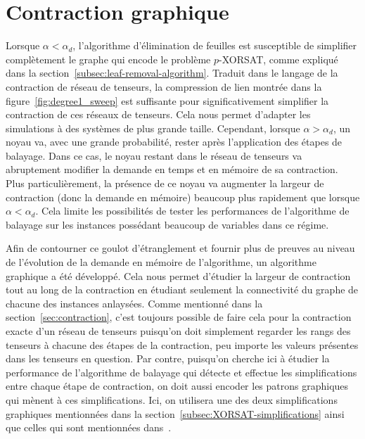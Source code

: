 \chapter{Contraction graphique} \label{ch:graphical-method}
Lorsque $\alpha < \alpha_d$, l'algorithme d'élimination de feuilles est susceptible de simplifier complètement le graphe qui encode le problème $p$-XORSAT, comme expliqué dans la section~\ref{subsec:leaf-removal-algorithm}.
Traduit dans le langage de la contraction de réseau de tenseurs, la compression de lien montrée dans la figure~\ref{fig:degree1_sweep} est suffisante pour significativement simplifier la contraction de ces réseaux de tenseurs.
Cela nous permet d'adapter les simulations à des systèmes de plus grande taille.
Cependant, lorsque $\alpha > \alpha_d$, un noyau va, avec une grande probabilité, rester après l'application des étapes de balayage.
Dans ce cas, le noyau restant dans le réseau de tenseurs va abruptement modifier la demande en temps et en mémoire de sa contraction.
Plus particulièrement, la présence de ce noyau va augmenter la largeur de contraction (donc la demande en mémoire) beaucoup plus rapidement que lorsque $\alpha < \alpha_d$.
Cela limite les possibilités de tester les performances de l'algorithme de balayage sur les instances possédant beaucoup de variables dans ce régime.

Afin de contourner ce goulot d'étranglement et fournir plus de preuves au niveau de l'évolution de la demande en mémoire de l'algorithme, un algorithme graphique a été développé.
Cela nous permet d'étudier la largeur de contraction tout au long de la contraction en étudiant seulement la connectivité du graphe de chacune des instances anlaysées.
Comme mentionné dans la section~\ref{sec:contraction}, c'est toujours possible de faire cela pour la contraction exacte d'un réseau de tenseurs puisqu'on doit simplement regarder les rangs des tenseurs à chacune des étapes de la contraction, peu importe les valeurs présentes dans les tenseurs en question.
Par contre, puisqu'on cherche ici à étudier la performance de l'algorithme de balayage qui détecte et effectue les simplifications entre chaque étape de contraction, on doit aussi encoder les patrons graphiques qui mènent à ces simplifications.
Ici, on utilisera une des deux simplifications graphiques mentionnées dans la section~\ref{subsec:XORSAT-simplifications} ainsi que celles qui sont mentionnées dans~\cite{denny_algebraically_2012}.


